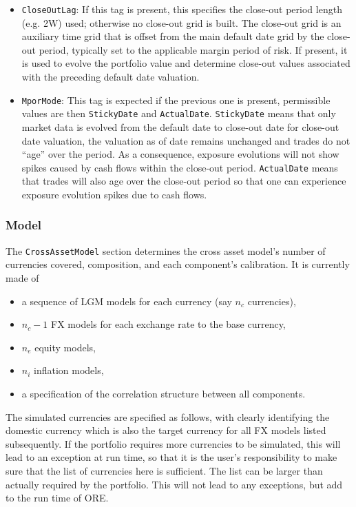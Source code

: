\documentclass[12pt, a4paper]{article}
\begin{document}
{{\begin{itemize}
{    Kuo2, Kuo3})
\item {\tt CloseOutLag}: If this tag is present, this specifies the close-out period length (e.g. 2W) used; otherwise no close-out grid is built. The close-out grid is an auxiliary time grid that is offset from the main default date grid by the close-out period, typically set to the applicable margin period of risk. If present, it is used to evolve the portfolio value and determine close-out values associated with the preceding default date valuation.
\item {\tt MporMode}: This tag is expected if the previous one is present, permissible values are then {\tt StickyDate} and {\tt ActualDate}. {\tt StickyDate} means that only market data is evolved from the default date to close-out date for close-out date valuation, the valuation as of date remains unchanged and trades do not ``age'' over the period. As a consequence, exposure evolutions will not show spikes caused by cash flows within the close-out period. {\tt ActualDate} means that trades will also age over the close-out period so that one can experience exposure evolution spikes due to cash flows. 
\end{itemize}

\subsubsection{Model}\label{sec:sim_model}

The {\tt CrossAssetModel} section determines the cross asset model's number of currencies covered, composition, and each
component's calibration. It is currently made of 
\begin{itemize}
\item a sequence of LGM models for each currency (say $n_c$ currencies), 
\item $n_c-1$ FX models for each exchange rate to the base currency, 
\item $n_e$ equity models,
\item $n_i$ inflation models, 
\item a specification of the correlation structure between all components.
\end{itemize}

\medskip The simulated currencies are specified as follows, with clearly identifying the domestic currency which is also
the target currency for all FX models listed subsequently. If the portfolio requires more currencies to be simulated,
this will lead to an exception at run time, so that it is the user's responsibility to make sure that the list of
currencies here is sufficient. The list can be larger than actually required by the portfolio. This will not lead to any
exceptions, but add to the run time of ORE.

}}
\end{document}
